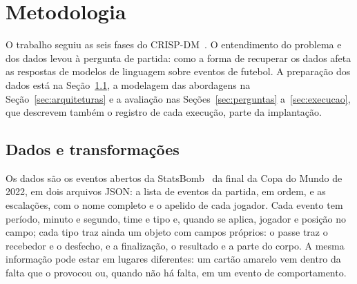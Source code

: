 %

\section{Metodologia}\label{sec:metodologia}

O trabalho seguiu as seis fases do CRISP-DM~\cite{schroer2021crispdm}. O entendimento do problema e dos dados
levou à pergunta de partida: como a forma de recuperar os dados afeta as respostas de modelos de linguagem
sobre eventos de futebol. A preparação dos dados está na Seção~\ref{sec:dados}, a modelagem das abordagens na
Seção~\ref{sec:arquiteturas} e a avaliação nas Seções~\ref{sec:perguntas} a~\ref{sec:execucao}, que descrevem
também o registro de cada execução, parte da implantação.

\subsection{Dados e transformações}\label{sec:dados}

Os dados são os eventos abertos da StatsBomb~\cite{statsbomb_opendata} da final da Copa do Mundo de 2022, em dois
arquivos JSON: a lista de eventos da partida, em ordem, e as escalações, com o nome completo e o apelido de cada
jogador. Cada evento tem período, minuto e segundo, time e tipo e, quando se aplica, jogador e posição no campo;
cada tipo traz ainda um objeto com campos próprios: o passe traz o recebedor e o desfecho, e a finalização, o
resultado e a parte do corpo. A mesma informação pode estar em lugares diferentes: um cartão amarelo vem dentro da
falta que o provocou ou, quando não há falta, em um evento de comportamento.

